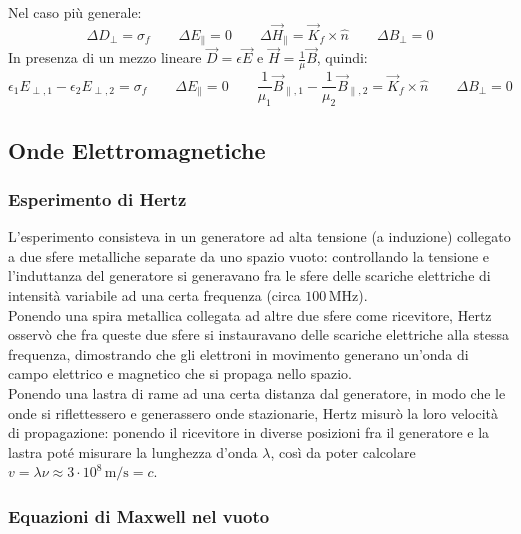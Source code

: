 Nel caso più generale:
\begin{equation}
	\Delta D_{\perp} = \sigma_f \qquad \Delta E_{\parallel} = 0 \qquad \Delta\vec{H}_{\parallel} = \vec{K}_f \times \hat{n} \qquad \Delta B_{\perp} = 0 
	\label{eq:7}
\end{equation}
In presenza di un mezzo lineare $ \vec{D} = \epsilon\vec{E} $ e $ \vec{H} = \frac{1}{\mu}\vec{B} $, quindi:
\begin{equation}
	\epsilon_1 E_{\perp,1} - \epsilon_2 E_{\perp,2} = \sigma_f \qquad \Delta E_{\parallel} = 0 \qquad \frac{1}{\mu_1}\vec{B}_{\parallel,1} - \frac{1}{\mu_2}\vec{B}_{\parallel,2} = \vec{K}_f \times \hat{n} \qquad \Delta B_{\perp} = 0 
	\label{eq:8}
\end{equation}

\subsection{Onde Elettromagnetiche}

\subsubsection{Esperimento di Hertz}

L'esperimento consisteva in un generatore ad alta tensione (a induzione) collegato a due sfere metalliche separate da uno spazio vuoto: controllando la tensione e l'induttanza del generatore si generavano fra le sfere delle scariche elettriche di intensità variabile ad una certa frequenza (circa $ 100\,\text{MHz} $). \\ 
%
Ponendo una spira metallica collegata ad altre due sfere come ricevitore, Hertz osservò che fra queste due sfere si instauravano delle scariche elettriche alla stessa frequenza, dimostrando che gli elettroni in movimento generano un'onda di campo elettrico e magnetico che si propaga nello spazio. \\ 
%
Ponendo una lastra di rame ad una certa distanza dal generatore, in modo che le onde si riflettessero e generassero onde stazionarie, Hertz misurò la loro velocità di propagazione: ponendo il ricevitore in diverse posizioni fra il generatore e la lastra poté misurare la lunghezza d'onda $ \lambda $, così da poter calcolare $ v = \lambda\nu \approx 3\cdot 10^8 \,\text{m/s} = c $.

\subsubsection{Equazioni di Maxwell nel vuoto}

